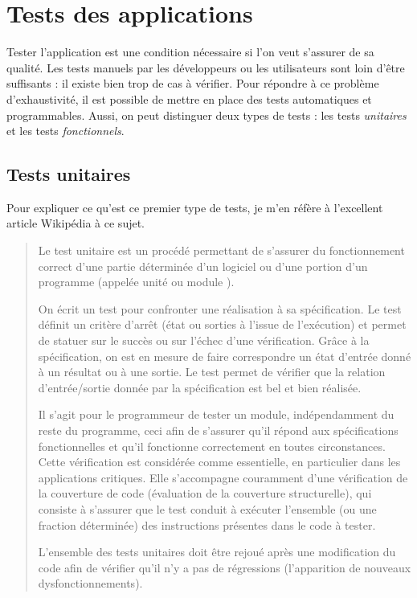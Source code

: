 \section{Tests des applications}

Tester l'application est une condition nécessaire si l'on veut s'assurer de sa qualité.
Les tests manuels par les développeurs ou les utilisateurs sont loin d'être suffisants : il existe bien trop de cas à vérifier.
Pour répondre à ce problème d'exhaustivité, il est possible de mettre en place des tests automatiques et programmables.
Aussi, on peut distinguer deux types de tests : les tests \emph{unitaires} et les tests \emph{fonctionnels}.



\subsection{Tests unitaires}

Pour expliquer ce qu'est ce premier type de tests, je m'en réfère à l'excellent article Wikipédia à ce sujet.~\cite{unit}

\begin{quotation}
Le test unitaire est un procédé permettant de s'assurer du fonctionnement correct d'une partie déterminée d'un logiciel ou d'une portion d'un programme (appelée \og unité \fg{} ou \og module \fg).

On écrit un test pour confronter une réalisation à sa spécification. Le test définit un critère d'arrêt (état ou sorties à l'issue de l'exécution) et permet de statuer sur le succès ou sur l'échec d'une vérification.
Grâce à la spécification, on est en mesure de faire correspondre un état d'entrée donné à un résultat ou à une sortie.
Le test permet de vérifier que la relation d'entrée/sortie donnée par la spécification est bel et bien réalisée.

Il s'agit pour le programmeur de tester un module, indépendamment du reste du programme, ceci afin de s'assurer qu'il répond aux spécifications fonctionnelles et qu'il fonctionne correctement en toutes circonstances.
Cette vérification est considérée comme essentielle, en particulier dans les applications critiques.
Elle s'accompagne couramment d'une vérification de la couverture de code (évaluation de la couverture structurelle), qui consiste à s'assurer que le test conduit à exécuter l'ensemble (ou une fraction déterminée) des instructions présentes dans le code à tester.

L'ensemble des tests unitaires doit être rejoué après une modification du code afin de vérifier qu'il n'y a pas de régressions (l'apparition de nouveaux dysfonctionnements).
\end{quotation}



